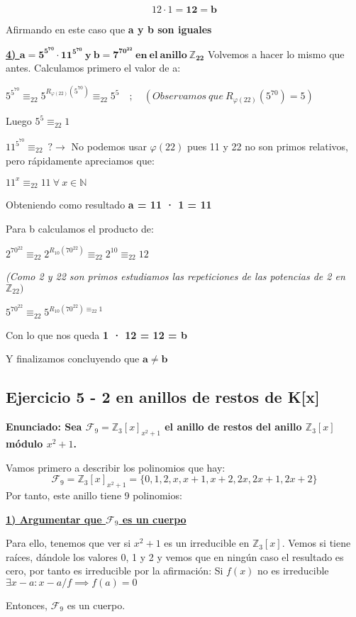 \documentclass[11pt, a4paper, titlepage]{article}
\providecommand{\ent}{\mathbb{Z}}
\begin{document}
$$12 \cdot 1 = \mathbf{12 = b}  $$

Afirmando en este caso que \textbf{a y b son iguales}


\textbf{\underline{4) $\mathbf{a = 5^{5^{70}} \cdot 11^{5^{70}}\ y\ b = 7^{70^{22}}\ en\ el\ anillo\ \ent_{22} }$}}
Volvemos a hacer lo mismo que antes. Calculamos primero el valor de a:

$5^{5^{70}} \equiv_{22} 5^{R_{\varphi(22)}(5^{70})}\equiv_{22}5^5\quad ;\quad (Observamos\ que\ R_{\varphi(22)}(5^{70}) = 5)$

Luego $5^5 \equiv_{22}1$

$11^{5^{70}}\equiv_{22}\ ?\rightarrow$ No podemos usar $\varphi(22)$ pues 11 y 22 no son primos relativos, pero rápidamente apreciamos que:

$11^x \equiv_{22} 11\ \forall\ x \in \mathbb{N}$

Obteniendo como resultado \textbf{a = 11 · 1 = 11}

Para b calculamos el producto de:

$2^{70^{22}}\equiv_{22}2^{R_{10}(70^{22})}\equiv_{22}2^{10}\equiv_{22}12$
 
\emph{(Como 2 y 22 son primos estudiamos las repeticiones de las potencias de 2 en $\ent_{22})$}

$5^{70^{22}}\equiv_{22}5^{R_{10}(70^{22})\equiv_{22}1}$

Con lo que nos queda \textbf{1 · 12 = 12 = b}

Y finalizamos concluyendo que $\mathbf{a \neq b}$




\subsection{\LARGE{Ejercicio 5 - 2 en anillos de restos de K[x]}} 

\textbf{Enunciado: Sea $\mathcal{F}_9 = \ent_3[x]_{ x^2 +1}$ el anillo de restos del anillo $\ent_3[x]$ módulo $x^2 +1$.}


Vamos primero a describir los polinomios que hay:
\[
\mathcal{F}_9 =\ent_3[x]_{x^2+1}= \{0,1,2,x,x+1,x+2,2x,2x+1,2x+2\}
\]
Por tanto, este anillo tiene 9 polinomios:

\underline{\textbf{1) Argumentar que $\mathcal{F}_9$ es un cuerpo}}

Para ello, tenemos que ver si $x^2+1$ es un irreducible en $\ent_3[x]$. Vemos si tiene raíces, dándole los valores 0, 1 y 2 y vemos que en ningún caso el resultado es cero, por tanto es irreducible por la afirmación: Si $f(x)$ no es irreducible $\exists x-a : x-a/f \implies f(a) = 0$

Entonces, $\mathcal{F}_9$ es un cuerpo.
\end{document}
